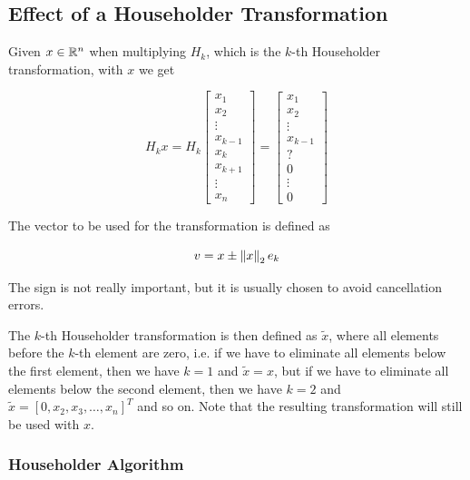 \subsection{Effect of a Householder Transformation}

Given \(x \in \mathbb{R}^n\) when multiplying \(H_k\), which is the \(k\)-th Householder transformation,
with \(x\) we get

\[
    H_k x =
    H_k
    \begin{bmatrix}
        x_1 \\ 
        x_2 \\ 
        \vdots \\
        x_{k - 1} \\ 
        x_k \\ 
        x_{k + 1} \\ 
        \vdots \\
        x_n
    \end{bmatrix}
    = 
    \begin{bmatrix}
        x_1 \\ 
        x_2 \\ 
        \vdots \\
        x_{k - 1} \\     
        ? \\ 
        0 \\ 
        \vdots \\
        0
    \end{bmatrix}
\]

The vector to be used for the transformation is defined as 

\[
    v = x \pm \left\| x \right\|_2 e_k
\]

The sign is not really important, but it is usually chosen to avoid cancellation errors. 

The \(k\)-th Householder transformation is then defined as \(\tilde{x}\), where all elements before the \(k\)-th element are zero, i.e. if we have to eliminate 
all elements below the first element, then we have \(k = 1\) and \(\tilde{x} = x\), but if we have to eliminate all elements below the second element, then we have \(k = 2\) and \(\tilde{x} = [0, x_2, x_3, \dots, x_n]^T\) and so on.
Note that the resulting transformation will still be used with \(x\).

\subsubsection*{Householder Algorithm}

